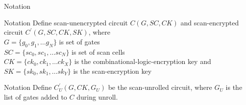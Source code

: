\begin{frame}{Notation}
\begin{block}{Notation}
Define scan-unencrypted circuit $C(G,SC,CK)$ and scan-encrypted circuit $C^{'}(G,SC,CK,SK)$, where \\
$G = \{g_0, g_1, \ldots g_N\}$ is set of gates \\
$SC = \{sc_0, sc_1, \ldots sc_N\}$ is set of scan cells \\
$CK = \{ck_0, ck_1, \ldots ck_X\}$ is the combinational-logic-encryption key and \\
$SK = \{sk_0, sk_1, \ldots sk_Y\}$ is the scan-encryption key \\
\end{block}

\begin{block}{Notation}
	Define $C^{'}_U(G,CK,G_U)$ be the scan-unrolled circuit, where $G_U$ is the list of gates added to $C$ during unroll.
\end{block}

\end{frame}


